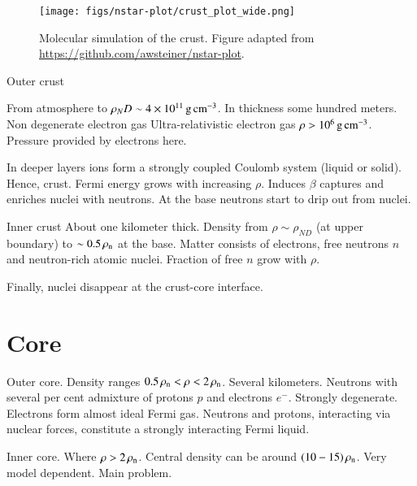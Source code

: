 \begin{figure}
\centering
\texttt{[image: figs/nstar-plot/crust\_plot\_wide.png]}
\caption{\label{fig:crust}
Molecular simulation of the crust.
Figure adapted from \url{https://github.com/awsteiner/nstar-plot}.
}
\end{figure}

Outer crust

From atmosphere to $\rho_ND \sim 4 \times 10^{11} \, \mathrm{g}\,\mathrm{cm}^{-3} $.
In thickness some hundred meters.
Non degenerate electron gas
Ultra-relativistic electron gas $\rho > 10^6 \, \mathrm{g}\,\mathrm{cm}^{-3} $.
Pressure provided by electrons here.

In deeper layers ions form a strongly coupled Coulomb system (liquid or solid).
Hence, crust.
Fermi energy grows with increasing $\rho$.
Induces $\beta$ captures and enriches nuclei with neutrons.
At the base neutrons start to drip out from nuclei.


Inner crust
About one kilometer thick.
Density from $\rho \sim \rho_{ND}$ (at upper boundary) to $\sim 0.5 \, \rho_{\mathrm{n}} $ at the base.
Matter consists of electrons, free neutrons $n$ and neutron-rich atomic nuclei.
Fraction of free $n$ grow with $\rho$.

Finally, nuclei disappear at the crust-core interface.

\section{Core}

Outer core.
Density ranges $0.5 \, \rho_{\mathrm{n}}  < \rho < 2\, \rho_{\mathrm{n}} $.
Several kilometers.
Neutrons with several per cent admixture of protons $p$ and electrons $e^{-}$.
Strongly degenerate.
Electrons form almost ideal Fermi gas.
Neutrons and protons, interacting via nuclear forces, constitute a strongly interacting Fermi liquid.

Inner core.
Where $\rho > 2\, \rho_{\mathrm{n}} $.
Central density can be around $(10-15)\, \rho_{\mathrm{n}} $.
Very model dependent.
Main problem.




